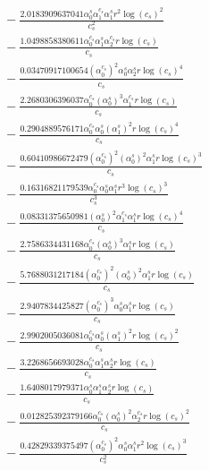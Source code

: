 \documentclass[10pt]{article}
\begin{document}
\begin{align*}
&{}  - \frac{2.0183909637041 \alpha_{0}^s \alpha_{1}^{c_s} \alpha_{1}^s r^{2} \log{\left(c_{s} \right)}^{2}}{c_{s}^{2}} \\
&{}  - \frac{1.0498858380611 \alpha_{0}^{c_s} \alpha_{1}^s \alpha_{2}^{c_s} r \log{\left(c_{s} \right)}}{c_{s}} \\
&{}  - \frac{0.03470917100654 \left(\alpha_{0}^{c_s}\right)^{2} \alpha_{0}^s \alpha_{2}^s r \log{\left(c_{s} \right)}^{4}}{c_{s}} \\
&{}  - \frac{2.2680306396037 \alpha_{0}^{c_s} \left(\alpha_{0}^s\right)^{3} \alpha_{1}^{c_s} r \log{\left(c_{s} \right)}}{c_{s}} \\
&{}  - \frac{0.2904889576171 \alpha_{0}^{c_s} \alpha_{0}^s \left(\alpha_{1}^s\right)^{2} r \log{\left(c_{s} \right)}^{4}}{c_{s}} \\
&{}  - \frac{0.60410986672479 \left(\alpha_{0}^{c_s}\right)^{2} \left(\alpha_{0}^s\right)^{2} \alpha_{1}^s r \log{\left(c_{s} \right)}^{3}}{c_{s}} \\
&{}  - \frac{0.16316821179539 \alpha_{0}^{c_s} \alpha_{0}^s \alpha_{1}^s r^{3} \log{\left(c_{s} \right)}^{3}}{c_{s}^{3}} \\
&{}  - \frac{0.08331375650981 \left(\alpha_{0}^s\right)^{2} \alpha_{1}^{c_s} \alpha_{1}^s r \log{\left(c_{s} \right)}^{4}}{c_{s}} \\
&{}  - \frac{2.7586334431168 \alpha_{0}^{c_s} \left(\alpha_{0}^s\right)^{3} \alpha_{1}^s r \log{\left(c_{s} \right)}}{c_{s}} \\
&{}  - \frac{5.7688031217184 \left(\alpha_{0}^{c_s}\right)^{2} \left(\alpha_{0}^s\right)^{2} \alpha_{1}^s r \log{\left(c_{s} \right)}}{c_{s}} \\
&{}  - \frac{2.9407834425827 \left(\alpha_{0}^{c_s}\right)^{3} \alpha_{0}^s \alpha_{1}^s r \log{\left(c_{s} \right)}}{c_{s}} \\
&{}  - \frac{2.9902005036081 \alpha_{0}^{c_s} \alpha_{0}^s \left(\alpha_{1}^s\right)^{2} r \log{\left(c_{s} \right)}^{2}}{c_{s}} \\
&{}  - \frac{3.2268656693028 \alpha_{0}^{c_s} \alpha_{1}^s \alpha_{2}^s r \log{\left(c_{s} \right)}}{c_{s}} \\
&{}  - \frac{1.6408017979371 \alpha_{0}^s \alpha_{1}^s \alpha_{2}^s r \log{\left(c_{s} \right)}}{c_{s}} \\
&{}  - \frac{0.012825392379166 \alpha_{0}^{c_s} \left(\alpha_{0}^s\right)^{2} \alpha_{2}^{c_s} r \log{\left(c_{s} \right)}^{2}}{c_{s}} \\
&{}  - \frac{0.42829339375497 \left(\alpha_{0}^{c_s}\right)^{2} \alpha_{0}^s \alpha_{1}^s r^{2} \log{\left(c_{s} \right)}^{3}}{c_{s}^{2}} \\

\end{align*}
\end{document}
